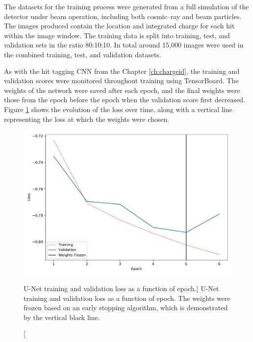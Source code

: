 The datasets for the training process were generated from a full simulation of 
the \protodune{} detector under beam operation, including both cosmic--ray and
beam particles. The images produced contain the location and integrated charge
for each hit within the image window. The training data is split into 
training, test, and validation sets in the ratio 80:10:10. In total around 
15,000 images were used in the combined training, test, and validation datasets.

As with the hit tagging CNN from the Chapter \ref{ch:chargeid}, the training and
validation scores were monitored throughout training using TensorBoard. The
weights of the network were saved after each epoch, and the final weights were
those from the epoch before the epoch when the validation score first decreased.
Figure \ref{fig:unet_loss} shows the evolution of the loss over time, along with
a vertical line representing the loss at which the weights were chosen.
\begin{figure}
	\centering
	\includegraphics[width=\textwidth]{figures/unet_loss.pdf}
	\caption
	[U-Net training and validation loss as a function of epoch.]
	{U-Net training and validation loss as a function of epoch. The weights were
	frozen based on an early stopping algorithm, which is demonstrated by the
	vertical black line.}
	\label{fig:unet_loss}
\end{figure}

